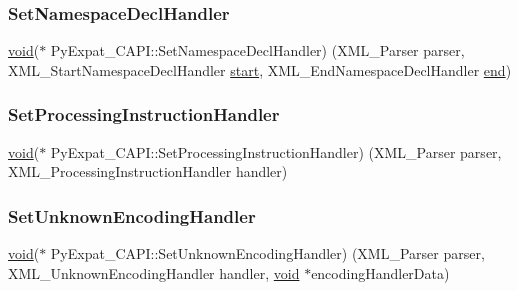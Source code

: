 \subsubsection{\texorpdfstring{SetNamespaceDeclHandler}{SetNamespaceDeclHandler}}
{\footnotesize\ttfamily \mbox{\hyperlink{_s_d_l__opengles2__gl2ext_8h_ae5d8fa23ad07c48bb609509eae494c95}{void}}($\ast$ Py\+Expat\+\_\+\+C\+A\+P\+I\+::\+Set\+Namespace\+Decl\+Handler) (X\+M\+L\+\_\+\+Parser parser, X\+M\+L\+\_\+\+Start\+Namespace\+Decl\+Handler \mbox{\hyperlink{_s_d_l__opengl_8h_ac55adc720a3098c1b454d2a4647f4361}{start}}, X\+M\+L\+\_\+\+End\+Namespace\+Decl\+Handler \mbox{\hyperlink{_s_d_l__opengl_8h_a432111147038972f06e049e18a837002}{end}})}

\mbox{\label{struct_py_expat___c_a_p_i_a215cc650811061dac3193bcb2c3473db}} 
\subsubsection{\texorpdfstring{SetProcessingInstructionHandler}{SetProcessingInstructionHandler}}
{\footnotesize\ttfamily \mbox{\hyperlink{_s_d_l__opengles2__gl2ext_8h_ae5d8fa23ad07c48bb609509eae494c95}{void}}($\ast$ Py\+Expat\+\_\+\+C\+A\+P\+I\+::\+Set\+Processing\+Instruction\+Handler) (X\+M\+L\+\_\+\+Parser parser, X\+M\+L\+\_\+\+Processing\+Instruction\+Handler handler)}

\mbox{\label{struct_py_expat___c_a_p_i_a0e096e97c2371eb148a6af3916cbba8d}} 
\subsubsection{\texorpdfstring{SetUnknownEncodingHandler}{SetUnknownEncodingHandler}}
{\footnotesize\ttfamily \mbox{\hyperlink{_s_d_l__opengles2__gl2ext_8h_ae5d8fa23ad07c48bb609509eae494c95}{void}}($\ast$ Py\+Expat\+\_\+\+C\+A\+P\+I\+::\+Set\+Unknown\+Encoding\+Handler) (X\+M\+L\+\_\+\+Parser parser, X\+M\+L\+\_\+\+Unknown\+Encoding\+Handler handler, \mbox{\hyperlink{_s_d_l__opengles2__gl2ext_8h_ae5d8fa23ad07c48bb609509eae494c95}{void}} $\ast$encoding\+Handler\+Data)}


